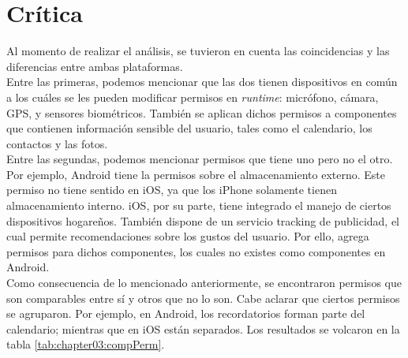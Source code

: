 \section{Crítica}
Al momento de realizar el análisis, se tuvieron en cuenta las coincidencias y las diferencias entre ambas plataformas.\\
Entre las primeras, podemos mencionar que las dos tienen dispositivos en común a los cuáles se les pueden modificar permisos en \textit{runtime}: micrófono, cámara, GPS, y sensores biométricos. También se aplican dichos permisos a componentes que contienen información sensible del usuario, tales como el calendario, los contactos y las fotos.\\
Entre las segundas, podemos mencionar permisos que tiene uno pero no el otro. Por ejemplo, Android tiene la permisos sobre el almacenamiento externo. Este permiso no tiene sentido en iOS, ya que los iPhone solamente tienen almacenamiento interno. iOS, por su parte, tiene integrado el manejo de ciertos dispositivos hogareños. También dispone de un servicio tracking de publicidad, el cual permite recomendaciones sobre los gustos del usuario. Por ello, agrega permisos para dichos componentes, los cuales no existes como componentes en Android.\\
Como consecuencia de lo mencionado anteriormente, se encontraron permisos que son comparables entre sí y otros que no lo son. Cabe aclarar que ciertos permisos se agruparon. Por ejemplo, en Android, los recordatorios forman parte del calendario; mientras que en iOS están separados. Los resultados se volcaron en la tabla \ref{tab:chapter03:compPerm}.\\

